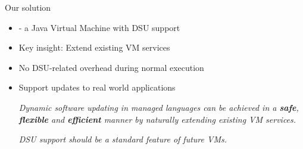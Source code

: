 
\begin{frame}{Our solution}%
\begin{itemize}
\item \DSU{} - a Java Virtual Machine with DSU support
\item Key insight: Extend existing VM services
\item No DSU-related overhead during normal execution
\item Support updates to real world applications
\begin{block}{}
\emph{Dynamic software updating in managed languages can be achieved in a
{\bf safe}, {\bf flexible} and {\bf efficient} manner by naturally extending existing VM
services.}
\end{block}

\begin{block}{}
\emph{DSU support should be a standard feature of future VMs.}
\end{block}
\end{itemize}
\end{frame}
